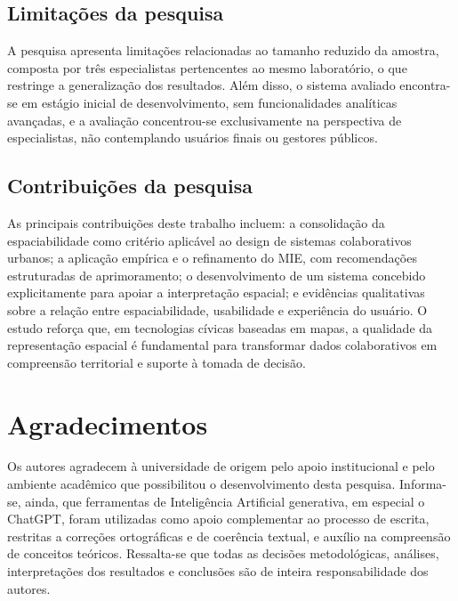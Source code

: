 \documentclass[12pt]{article}
\begin{document}
\subsection{Limitações da pesquisa}

A pesquisa apresenta limitações relacionadas ao tamanho reduzido da amostra, composta por três especialistas pertencentes ao mesmo laboratório, o que restringe a generalização dos resultados. Além disso, o sistema avaliado encontra-se em estágio inicial de desenvolvimento, sem funcionalidades analíticas avançadas, e a avaliação concentrou-se exclusivamente na perspectiva de especialistas, não contemplando usuários finais ou gestores públicos.

\subsection{Contribuições da pesquisa}

As principais contribuições deste trabalho incluem: a consolidação da espaciabilidade como critério aplicável ao design de sistemas colaborativos urbanos; a aplicação empírica e o refinamento do MIE, com recomendações estruturadas de aprimoramento; o desenvolvimento de um sistema concebido explicitamente para apoiar a interpretação espacial; e evidências qualitativas sobre a relação entre espaciabilidade, usabilidade e experiência do usuário. O estudo reforça que, em tecnologias cívicas baseadas em mapas, a qualidade da representação espacial é fundamental para transformar dados colaborativos em compreensão territorial e suporte à tomada de decisão.










\section*{Agradecimentos}


Os autores agradecem à universidade de origem pelo apoio institucional e pelo ambiente acadêmico que possibilitou o desenvolvimento desta pesquisa. Informa-se, ainda, que ferramentas de Inteligência Artificial generativa, em especial o ChatGPT, foram utilizadas como apoio complementar ao processo de escrita, restritas a correções ortográficas e de coerência textual, e auxílio na compreensão de conceitos teóricos. Ressalta-se que todas as decisões metodológicas, análises, interpretações dos resultados e conclusões são de inteira responsabilidade dos autores.





\end{document}
